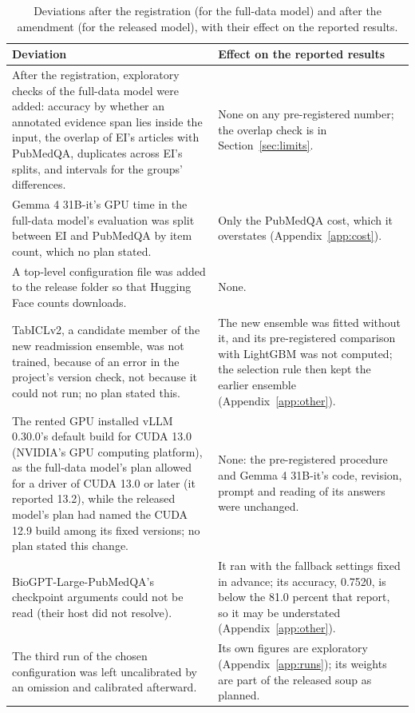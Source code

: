 \documentclass[11pt,letterpaper]{article}
\newcommand{\idn}[1]{#1}%
\begin{document}
\begin{table}[H]
\centering\footnotesize
\caption{Deviations after the registration (for the full-data model) and after the amendment (for the released model), with their effect on the reported results.}
\label{tab:deviations}
\begin{tabular}{>{\raggedright\arraybackslash}p{8.6cm}>{\raggedright\arraybackslash}p{6.4cm}}
\toprule
Deviation & Effect on the reported results \\
\midrule
After the registration, exploratory checks of the full-data model were added: accuracy by whether an annotated evidence span lies inside the input, the overlap of EI's articles with PubMedQA, duplicates across EI's splits, and intervals for the groups' differences. & None on any pre-registered number; the overlap check is in Section~\ref{sec:limits}. \\[2pt]
Gemma 4 31B-it's GPU time in the full-data model's evaluation was split between EI and PubMedQA by item count, which no plan stated. & Only the PubMedQA cost, which it overstates (Appendix~\ref{app:cost}). \\[2pt]
A top-level configuration file was added to the release folder so that Hugging Face counts downloads. & None. \\[2pt]
TabICLv2, a candidate member of the new readmission ensemble, was not trained, because of an error in the project's version check, not because it could not run; no plan stated this. & The new ensemble was fitted without it, and its pre-registered comparison with LightGBM was not computed; the selection rule then kept the earlier ensemble (Appendix~\ref{app:other}). \\[2pt]
The rented GPU installed vLLM \idn{0.30.0}'s default build for CUDA \idn{13.0} (NVIDIA's GPU computing platform), as the full-data model's plan allowed for a driver of CUDA \idn{13.0} or later (it reported \idn{13.2}), while the released model's plan had named the CUDA \idn{12.9} build among its fixed versions; no plan stated this change. & None: the pre-registered procedure and Gemma 4 31B-it's code, revision, prompt and reading of its answers were unchanged. \\[2pt]
BioGPT-Large-PubMedQA's checkpoint arguments could not be read (their host did not resolve). & It ran with the fallback settings fixed in advance; its accuracy, 0.7520, is below the 81.0 percent that \citet{luo2022} report, so it may be understated (Appendix~\ref{app:other}). \\[2pt]
The third run of the chosen configuration was left uncalibrated by an omission and calibrated afterward. & Its own figures are exploratory (Appendix~\ref{app:runs}); its weights are part of the released soup as planned. \\
\bottomrule
\end{tabular}
\end{table}
\end{document}
